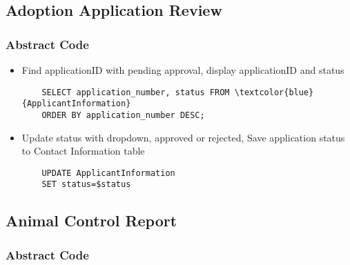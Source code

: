 \documentclass[a4paper]{article}
\begin{document}
\hypertarget{adoption_app_review}{\subsection{Adoption Application Review}}

\subsubsection*{Abstract Code}

\begin{itemize}
	\item Find applicationID with pending approval, display applicationID and status
	\begin{lstlisting}
	SELECT application_number, status FROM \textcolor{blue}{ApplicantInformation}
	ORDER BY application_number DESC;
	\end{lstlisting}

	\item Update status with dropdown, approved or rejected, Save application status to Contact Information table
	\begin{lstlisting}
	UPDATE ApplicantInformation
	SET status=$status
	\end{lstlisting}
\end{itemize}

\hypertarget{animal_control_report}{\subsection{Animal Control Report}}

\subsubsection*{Abstract Code}
\end{document}
